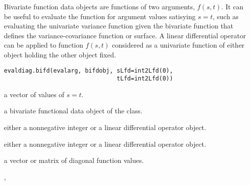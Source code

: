 \begin{Description}\relax
Bivariate function data objects are functions of
two arguments, $f(s,t)$.  It can be useful to evaluate
the function for argument values satisying $s=t$, such
as evaluating the univariate variance function given the
bivariate function that defines the variance-covariance
function or surface.  A linear differential operator can
be applied to function $f(s,t)$ considered as a univariate
function of either object holding the other object fixed.
\end{Description}
\begin{Usage}
\begin{verbatim}
evaldiag.bifd(evalarg, bifdobj, sLfd=int2Lfd(0),
                                tLfd=int2Lfd(0))
\end{verbatim}
\end{Usage}
\begin{Arguments}
\begin{ldescription}
\item[\code{evalarg}] a vector of values of $s = t$.

\item[\code{bifdobj}] a bivariate functional data object of the  class.

\item[\code{sLfd}] either a nonnegative integer or a linear differential operator
object.

\item[\code{tLfd}] either a nonnegative integer or a linear differential operator
object.

\end{ldescription}
\end{Arguments}
\begin{Value}
a vector or matrix of diagonal function values.
\end{Value}
\begin{SeeAlso}\relax
{}, 
\end{SeeAlso}

